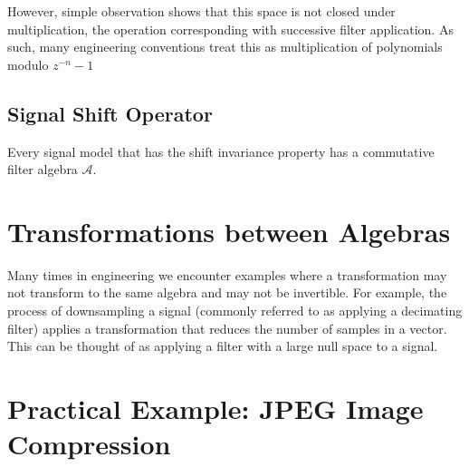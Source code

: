 \documentclass[12pt,technote]{IEEEtran}
\begin{document}
However, simple observation shows that this space is not closed under multiplication, the operation corresponding with successive filter application. As such, many engineering conventions treat this as multiplication of polynomials modulo $z^{-n}-1$

\subsection{Signal Shift Operator}
Every signal model that has the shift invariance property has a commutative filter algebra $\mathcal{A}$.
\section{Transformations between Algebras}
Many times in engineering we encounter examples where a transformation may not transform to the same algebra and may not be invertible. For example, the process of downsampling a signal (commonly referred to as applying a decimating filter) applies a transformation that reduces the number of samples in a vector. This can be thought of as applying a filter with a large null space to a signal.

\section{Practical Example: JPEG Image Compression}


\end{document}
